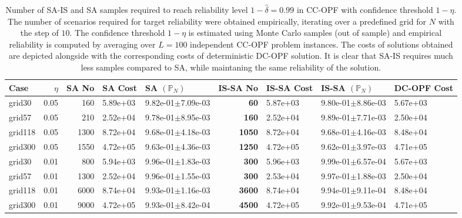 \begin{landscape}
\begin{table}[t]
\caption{Number of SA-IS and SA samples required to reach reliability level $1-\hat{\delta} = 0.99$ in CC-OPF with confidence threshold $1-\eta$. The number of scenarios required for target reliability were obtained empirically, iterating over a predefined grid for $N$ with the step of $10$.
    The confidence threshold $1-\eta$ is estimated using Monte Carlo samples (out of sample) and empirical reliability is computed by averaging over $L=100$ independent CC-OPF problem instances. The costs of solutions obtained are depicted alongside with the corresponding costs of deterministic DC-OPF solution. It is clear that SA-IS requires much less samples compared to SA, while maintaning the same reliability of the solution.}
    \centering
        \begin{tabular}{|lrrll|rll|l|}
        \toprule
           Case &  $\eta$ &  SA No &  SA Cost &   SA $(\mathbb{P}_N)$ &  IS-SA No & IS-SA Cost & IS-SA $(\mathbb{P}_N)$ & DC-OPF Cost \\
        \midrule
         grid30 &    0.05 &    160 & 5.89e+03 & 9.82e-01$\pm$7.09e-03 &        \textbf{60} &   5.87e+03 &  9.80e-01$\pm$8.86e-03 &    5.67e+03 \\
         grid57 &    0.05 &    210 & 2.52e+04 & 9.78e-01$\pm$8.95e-03 &       \textbf{160} &   2.52e+04 &  9.89e-01$\pm$7.71e-03 &    2.50e+04 \\
        grid118 &    0.05 &   1300 & 8.72e+04 & 9.68e-01$\pm$4.18e-03 &      \textbf{1050} &   8.72e+04 &  9.68e-01$\pm$4.16e-03 &    8.48e+04 \\
        grid300 &    0.05 &   1550 & 4.72e+05 & 9.63e-01$\pm$4.36e-03 &      \textbf{1250} &   4.72e+05 &  9.62e-01$\pm$3.97e-03 &    4.71e+05 \\
        \midrule
         grid30 &    0.01 &    800 & 5.94e+03 & 9.96e-01$\pm$1.83e-03 &       \textbf{300} &   5.96e+03 &  9.99e-01$\pm$6.57e-04 &    5.67e+03 \\
         grid57 &    0.01 &   1300 & 2.52e+04 & 9.96e-01$\pm$1.55e-03 &       \textbf{300} &   2.53e+04 &  9.97e-01$\pm$1.88e-03 &    2.50e+04 \\
        grid118 &    0.01 &   6000 & 8.74e+04 & 9.93e-01$\pm$1.16e-03 &      \textbf{3600} &   8.74e+04 &  9.94e-01$\pm$9.11e-04 &    8.48e+04 \\
        grid300 &    0.01 &   9000 & 4.72e+05 & 9.93e-01$\pm$8.42e-04 &      \textbf{4500} &   4.72e+05 &  9.92e-01$\pm$9.53e-04 &    4.71e+05 \\
        \bottomrule
        \end{tabular}
    \label{tab:summary_results}
\end{table}
\end{landscape}
